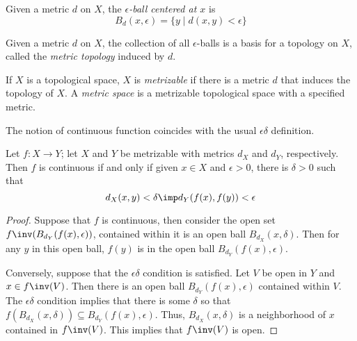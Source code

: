 \documentclass{amsart}
\begin{document}
\begin{defn}
  Given a metric $d$ on $X$, the \emph{$\epsilon$-ball centered at $x$} is
  \[
    B_{d}(x,\epsilon) = \{ y \mid d(x,y) < \epsilon \}
  \]
\end{defn}

\begin{defn}
  Given a metric $d$ on $X$, the collection of all $\epsilon$-balls is a basis for a topology on $X$, called the \emph{metric topology} induced by $d$.
\end{defn}

\begin{defn}
  If $X$ is a topological space, $X$ is \emph{metrizable} if there is a metric $d$ that induces the topology of $X$.
  A \emph{metric space} is a metrizable topological space with a specified metric.
\end{defn}

The notion of continuous function coincides with the usual $\epsilon\delta$ definition.
\begin{thm}
  Let $f : X \to Y$; let $X$ and $Y$ be metrizable with metrics $d_{X}$ and $d_{Y}$, respectively.
  Then $f$ is continuous if and only if given $x \in X$ and $\epsilon > 0$, there is $\delta > 0$ such that
  \[
    d_{X}(x,y) < \delta \imp d_{Y}(f(x),f(y)) < \epsilon
  \]
\end{thm}
\begin{proof}
  Suppose that $f$ is continuous, then consider the open set $f\inv(B_{d_{Y}}(f(x),\epsilon))$, contained within it is an open ball $B_{d_{X}}(x,\delta)$.
  Then for any $y$ in this open ball, $f(y)$ is in the open ball $B_{d_{Y}}(f(x),\epsilon)$.

  Conversely, suppose that the $\epsilon\delta$ condition is satisfied.
  Let $V$ be open in $Y$ and $x \in f\inv(V)$.
  Then there is an open ball $B_{d_{Y}}(f(x),\epsilon)$ contained within $V$.
  The $\epsilon\delta$ condition implies that there is some $\delta$ so that $f(B_{d_{X}}(x,\delta)) \subseteq B_{d_{Y}}(f(x),\epsilon)$.
  Thus, $B_{d_{X}}(x,\delta)$ is a neighborhood of $x$ contained in $f\inv(V)$.
  This implies that $f\inv(V)$ is open.
\end{proof}
\end{document}
